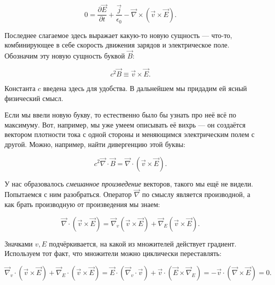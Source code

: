\documentclass[a4paper,12pt]{article}
\numberwithin{equation}{section}
\newcommand{\pt}{\partial}
\newcommand{\eps}{\epsilon}
\newcommand{\vn}{\vec{\nabla}}
\begin{document}
\begin{equation}
  \label{eq:maxwell_eq_4_1}
  0 = \frac{\pt \vec{E}}{\pt t} + \frac{\vec{j}}{\eps_0} - \vn \times \left(
    \vec{v} \times \vec{E} \right).
\end{equation}

Последнее слагаемое здесь выражает какую-то новую сущность — что-то,
комбинирующее в себе скорость движения зарядов и электрическое
поле. Обозначим эту новую сущность буквой $\vec{B}$: 

\begin{equation}
  \label{eq:def_magnetic}
  c^2\vec{B} \equiv \vec{v} \times \vec{E}. 
\end{equation}

Константа $c$ введена здесь для удобства. В дальнейшем мы придадим ей
ясный физический смысл.

Если мы ввели новую букву, то естественно было бы узнать про неё всё
по максимуму. Вот, например, мы уже умеем описывать её вихрь — он
создаётся вектором плотности тока с одной стороны и меняющимся
электрическим полем с другой. Можно, например, найти дивергенцию этой
буквы:

\begin{equation}
  \label{eq:div_B_1}
  c^2\vn \cdot \vec{B} =  \vn \cdot \left( \vec{v} \times \vec{E} \right).
\end{equation}

У нас образовалось \textit{смешанное произведение} векторов, такого мы
ещё не видели. Попытаемся с ним разобраться. Оператор $\vn$ по смыслу
является производной, а как брать производную от произведения мы
знаем: 

\begin{equation}
  \label{eq:nabla_eq_1}
  \vn \cdot \left( \vec{v} \times \vec{E} \right) = \vn_v \left(
    \vec{v} \times \vec{E} \right)  + \vn_E \left( \vec{v} \times \vec{E} \right).
\end{equation}

Значками $v,E$ подчёркивается, на какой из множителей действует
градиент. Используем тот факт, что множители можно циклически
переставлять: 

\begin{equation}
  \label{eq:nabla_eq_2}
  \vn_v \cdot \left(
    \vec{v} \times \vec{E} \right)  + \vn_E \cdot \left( \vec{v} \times
    \vec{E} \right) = \vec{E} \cdot \left( \vn_v \cdot \vec{v} \right) +
  \vec{v} \cdot \left( \vec{E} \times \vn_E \right) = -\vec{v} \cdot
  \left( \vn \times \vec{E} \right) =0.
\end{equation}
\end{document}
